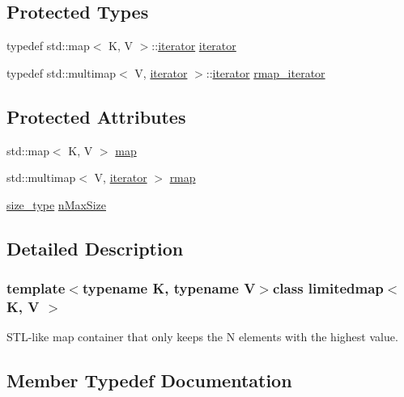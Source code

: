 \subsection*{Protected Types}
\begin{DoxyCompactItemize}
\item 
typedef std\+::map$<$ K, V $>$\+::\hyperlink{classlimitedmap_aea661213ab6f699e9667bea25bf99821}{iterator} \hyperlink{classlimitedmap_aea661213ab6f699e9667bea25bf99821}{iterator}
\item 
typedef std\+::multimap$<$ V, \hyperlink{classlimitedmap_aea661213ab6f699e9667bea25bf99821}{iterator} $>$\+::\hyperlink{classlimitedmap_aea661213ab6f699e9667bea25bf99821}{iterator} \hyperlink{classlimitedmap_ad3d926b1f365d819073ddaed8daa4400}{rmap\+\_\+iterator}
\end{DoxyCompactItemize}
\subsection*{Protected Attributes}
\begin{DoxyCompactItemize}
\item 
std\+::map$<$ K, V $>$ \hyperlink{classlimitedmap_a66e668a5286b7b82061c6867548897a0}{map}
\item 
std\+::multimap$<$ V, \hyperlink{classlimitedmap_aea661213ab6f699e9667bea25bf99821}{iterator} $>$ \hyperlink{classlimitedmap_ab4a6f5b1572ee3754d53f7773b381eb2}{rmap}
\item 
\hyperlink{classlimitedmap_a1c564b323f94e182e56aa27975e5f9d1}{size\+\_\+type} \hyperlink{classlimitedmap_a3ff20a34a489085042060796d44a644e}{n\+Max\+Size}
\end{DoxyCompactItemize}


\subsection{Detailed Description}
\subsubsection*{template$<$typename K, typename V$>$class limitedmap$<$ K, V $>$}

S\+T\+L-\/like map container that only keeps the N elements with the highest value. 

\subsection{Member Typedef Documentation}
\hypertarget{classlimitedmap_ab0a3e4f2ec7c82359300c83a35ae2500}{}

